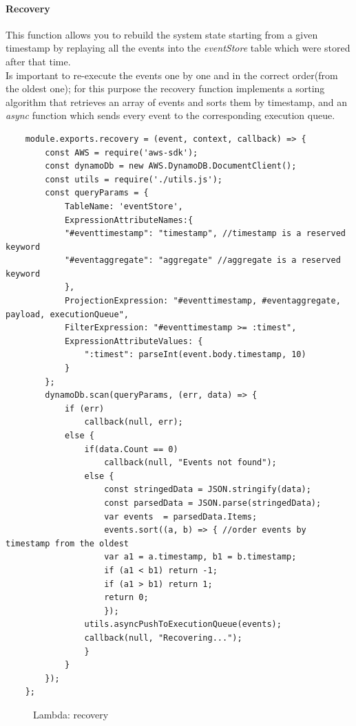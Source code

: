 \paragraph{Recovery} \Spazio
This function allows you to rebuild the system state starting from a given timestamp by replaying all the events into the \emph{eventStore} table which were stored after that time. \\
Is important to re-execute the events one by one and in the correct order(from the oldest one); for this purpose the recovery function implements a sorting algorithm that retrieves an array of events and sorts them by timestamp, and an \emph{async} function which sends every event to the corresponding execution queue.
\begin{lstlisting}
	module.exports.recovery = (event, context, callback) => { 
		const AWS = require('aws-sdk');
		const dynamoDb = new AWS.DynamoDB.DocumentClient();
		const utils = require('./utils.js');
		const queryParams = { 
			TableName: 'eventStore',
			ExpressionAttributeNames:{
			"#eventtimestamp": "timestamp", //timestamp is a reserved keyword
			"#eventaggregate": "aggregate" //aggregate is a reserved keyword 
			},
			ProjectionExpression: "#eventtimestamp, #eventaggregate, payload, executionQueue",
			FilterExpression: "#eventtimestamp >= :timest",
			ExpressionAttributeValues: {
				":timest": parseInt(event.body.timestamp, 10)
			}
		};
		dynamoDb.scan(queryParams, (err, data) => {
			if (err)
				callback(null, err);
			else {
				if(data.Count == 0)
					callback(null, "Events not found");
				else {
					const stringedData = JSON.stringify(data);
					const parsedData = JSON.parse(stringedData);
					var events  = parsedData.Items;
					events.sort((a, b) => { //order events by timestamp from the oldest
					var a1 = a.timestamp, b1 = b.timestamp;
					if (a1 < b1) return -1;
					if (a1 > b1) return 1;
					return 0;
					});
				utils.asyncPushToExecutionQueue(events);
				callback(null, "Recovering...");
				}
			} 
		});
	};
\end{lstlisting}
\begin{figure} [H]
	\caption{Lambda: recovery}
\end{figure}

